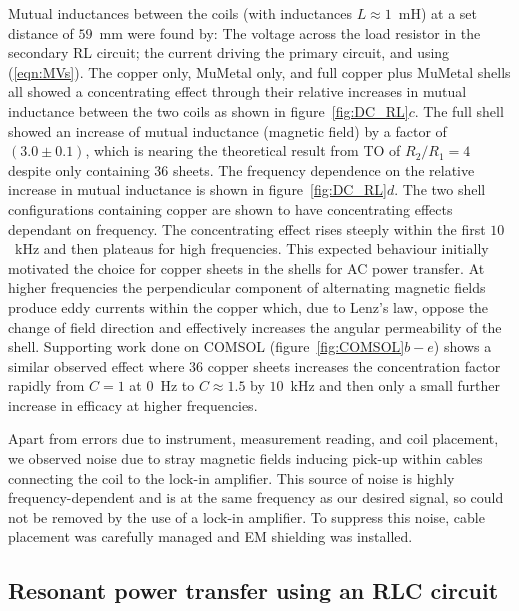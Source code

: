 \documentclass[11pt]{iopart}
\begin{document}
Mutual inductances between
the coils (with inductances $L\approx 1$~mH) at a set distance of
$59$~mm were found by: The voltage across the load resistor
in the secondary RL circuit; the current driving the primary
circuit, and using (\ref{eqn:MVs}). The copper only, MuMetal
only, and full copper plus MuMetal shells all showed a concentrating
effect through their relative increases in mutual inductance between the
two coils as shown in figure~\ref{fig:DC_RL}$c$. The full shell
showed an increase of mutual inductance (magnetic field) by a factor
of $(3.0\pm0.1)$, which is nearing the theoretical result from TO of
$R_2/R_1 = 4$ despite only containing $36$ sheets. The frequency
dependence on the relative increase in mutual inductance is shown in
figure~\ref{fig:DC_RL}$d$. The two shell configurations containing
copper are shown to have concentrating effects dependant on
frequency. The concentrating effect rises steeply within the first
$10$~kHz and then plateaus for high frequencies.  This expected
behaviour initially motivated the choice for copper sheets in the
shells for AC power transfer. At higher frequencies the perpendicular
component of alternating magnetic fields produce eddy currents within
the copper which, due to Lenz's law, oppose the change of field
direction and effectively increases the angular permeability of the
shell.  Supporting work done on COMSOL (figure~\ref{fig:COMSOL}$b-e$)
shows a similar observed effect where $36$ copper sheets increases the
concentration factor rapidly from $C = 1$ at $0$~Hz to $C \approx 1.5$
by $10$~kHz and then only a small further increase in efficacy at
higher frequencies.

Apart from errors due to instrument, measurement
reading, and coil placement, we observed noise due to stray magnetic
fields inducing pick-up within cables connecting the coil to the
lock-in amplifier. This source of noise is highly frequency-dependent
and is at the same frequency as our desired signal, so could not be
removed by the use of a lock-in amplifier. To suppress this noise,
cable placement was carefully managed and EM shielding was installed.

\subsection*{Resonant power transfer using an RLC circuit}
\end{document}
